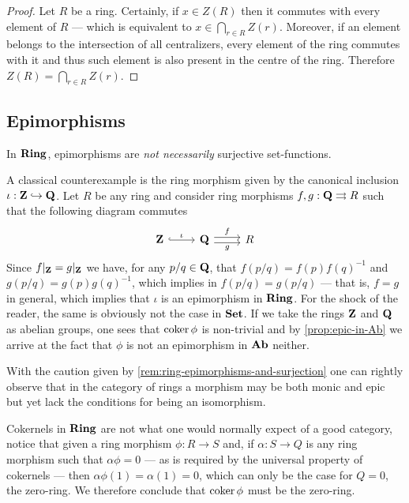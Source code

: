 %
\begin{proof}
Let \(R\) be a ring. Certainly, if \(x \in Z(R)\) then it commutes with every
element of \(R\) --- which is equivalent to \(x \in \bigcap_{r \in R}
Z(r)\). Moreover, if an element belongs to the intersection of all centralizers,
every element of the ring commutes with it and thus such element is also present
in the centre of the ring. Therefore \(Z(R) = \bigcap_{r \in R} Z(r)\).
\end{proof}
%

\subsection{Epimorphisms}

%
\begin{remark}
\label{rem:ring-epimorphisms-and-surjection}
In \({\textbf{Ring}}\), epimorphisms are \emph{not necessarily} surjective set-functions.

A classical counterexample is the ring morphism given by the canonical inclusion
\(\iota: \mathbf{Z} \hookrightarrow \mathbf{Q}\). Let \(R\) be any ring and consider ring morphisms
\(f, g: \mathbf{Q} \rightrightarrows R\) such that the following diagram commutes
\[
\begin{tikzcd}
\Z \ar[r, hook, "\iota"]
&\Q \ar[r, shift left, "f"] \ar[r, shift right, swap, "g"]
&R
\end{tikzcd}
\]
Since \(f|_{\mathbf{Z}} = g|_{\mathbf{Z}}\) we have, for any \(p/q \in \mathbf{Q}\), that
\(f(p/q) = f(p) f(q)^{-1}\) and \(g(p/q) = g(p) g(q)^{-1}\), which implies in
\(f(p/q) = g(p/q)\) --- that is, \(f = g\) in general, which implies that
\(\iota\) is an epimorphism in \({\textbf{Ring}}\). For the shock of the reader, the same
is obviously not the case in \({\textbf{Set}}\). If we take the rings \(\mathbf{Z}\) and \(\mathbf{Q}\) as
abelian groups, one sees that \(\operatorname{coker} \phi\) is non-trivial and by
\cref{prop:epic-in-Ab} we arrive at the fact that \(\phi\) is not an epimorphism
in \({\textbf{Ab}}\) neither.
\end{remark}
%

%
\begin{remark}
\label{rem:isomorphisms-in-ring}
With the caution given by \cref{rem:ring-epimorphisms-and-surjection} one can
rightly observe that in the category of rings a morphism may be both monic and
epic but yet lack the conditions for being an isomorphism.
\end{remark}
%

\begin{remark}
\label{rem:cokernel-in-ring}
Cokernels in \({\textbf{Ring}}\) are not what one would normally expect of a good category,
notice that given a ring morphism \(\phi: R \to S\) and, if \(\alpha: S \to Q\)
is any ring morphism such that \(\alpha \phi = 0\) --- as is required by the
universal property of cokernels --- then \(\alpha\phi(1) = \alpha(1) = 0\),
which can only be the case for \(Q = 0\), the zero-ring. We therefore conclude
that \(\operatorname{coker} \phi\) must be the zero-ring.
\end{remark}

